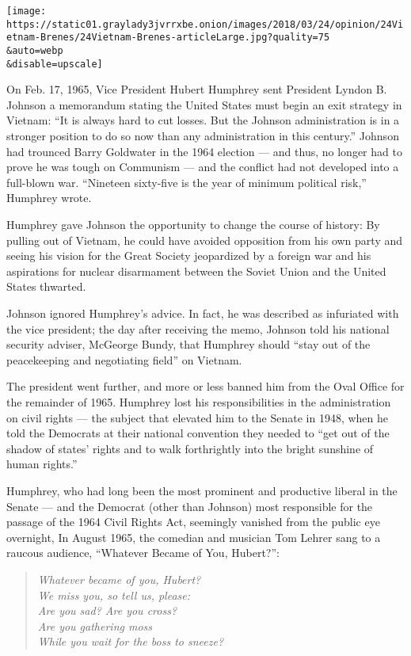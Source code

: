 \texttt{[image: https://static01.graylady3jvrrxbe.onion/images/2018/03/24/opinion/24Vietnam-Brenes/24Vietnam-Brenes-articleLarge.jpg?quality=75\\\&auto=webp\\\&disable=upscale]}

On Feb. 17, 1965, Vice President Hubert Humphrey sent President Lyndon
B. Johnson a memorandum stating the United States must begin an exit
strategy in Vietnam: ``It is always hard to cut losses. But the Johnson
administration is in a stronger position to do so now than any
administration in this century.'' Johnson had trounced Barry Goldwater
in the 1964 election --- and thus, no longer had to prove he was tough
on Communism --- and the conflict had not developed into a full-blown
war. ``Nineteen sixty-five is the year of minimum political risk,''
Humphrey wrote.

Humphrey gave Johnson the opportunity to change the course of history:
By pulling out of Vietnam, he could have avoided opposition from his own
party and seeing his vision for the Great Society jeopardized by a
foreign war and his aspirations for nuclear disarmament between the
Soviet Union and the United States thwarted.

Johnson ignored Humphrey's advice. In fact, he was described as
infuriated with the vice president; the day after receiving the memo,
Johnson told his national security adviser, McGeorge Bundy, that
Humphrey should ``stay out of the peacekeeping and negotiating field''
on Vietnam.

The president went further, and more or less banned him from the Oval
Office for the remainder of 1965. Humphrey lost his responsibilities in
the administration on civil rights --- the subject that elevated him to
the Senate in 1948, when he told the Democrats at their national
convention they needed to ``get out of the shadow of states' rights and
to walk forthrightly into the bright sunshine of human rights.''

Humphrey, who had long been the most prominent and productive liberal in
the Senate --- and the Democrat (other than Johnson) most responsible
for the passage of the 1964 Civil Rights Act, seemingly vanished from
the public eye overnight, In August 1965, the comedian and musician Tom
Lehrer sang to a raucous audience, ``Whatever Became of You, Hubert?'':

\begin{quote}
\emph{Whatever became of you, Hubert?}\\
\emph{We miss you, so tell us, please:}\\
\emph{Are you sad? Are you cross?}\\
\emph{Are you gathering moss}\\
\emph{While you wait for the boss to sneeze?}
\end{quote}

